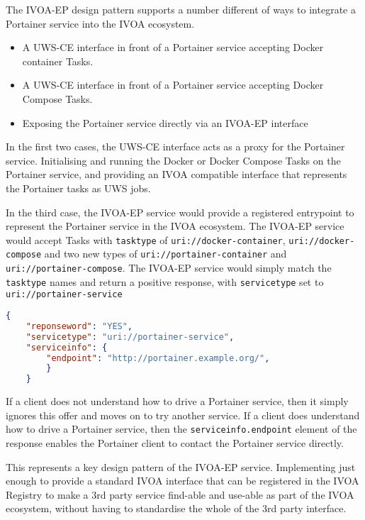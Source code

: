 \documentclass[11pt,a4paper]{ivoa}
\newcommand{\uws} {UWS\xspace}
\newcommand{\uwsce} {UWS-CE\xspace}
\newcommand{\ivoep} {IVOA-EP\xspace}
\newcommand{\docker} {Docker\xspace}
\newcommand{\dockercompose} {Docker Compose\xspace}
\newcommand{\portainer} {Portainer\xspace}
\newcommand{\codeword}[1] {\texttt{#1}}
\begin{document}
The \ivoep design pattern supports a number different of ways to integrate a \portainer service into the IVOA ecosystem.
\begin{itemize}
    \item A \uwsce interface in front of a \portainer service accepting \docker container Tasks.
    \item A \uwsce interface in front of a \portainer service accepting \dockercompose Tasks.
    \item Exposing the \portainer service directly via an \ivoep interface
\end{itemize}

In the first two cases, the \uwsce interface acts as a proxy for the \portainer service. Initialising and running the \docker or \dockercompose Tasks on the \portainer service, and providing an IVOA compatible interface that represents the \portainer tasks as \uws jobs.

In the third case, the \ivoep service would provide a registered entrypoint to represent the \portainer service in the IVOA ecosystem. 
The \ivoep service would accept Tasks with \codeword{tasktype} of \codeword{uri://docker-container}, \codeword{uri://docker-compose} and two new types of \codeword{uri://portainer-container} and  \codeword{uri://portainer-compose}.
The \ivoep service would simply match the \codeword{tasktype} names and return a positive response, with \codeword{servicetype} set to \codeword{uri://portainer-service}

\begin{lstlisting}[language=json]
    {
    "reponseword": "YES",
    "servicetype": "uri://portainer-service",
    "serviceinfo": {
        "endpoint": "http://portainer.example.org/",
        }
    }
\end{lstlisting}

If a client does not understand how to drive a \portainer service, then it simply ignores this offer and moves on to try another service.
If a client does understand how to drive a \portainer service, then the \codeword{serviceinfo.endpoint} element of the response enables the \portainer client to contact the \portainer service directly.

This represents a key design pattern of the \ivoep service. Implementing just enough to provide a standard IVOA interface that can be registered in the IVOA Registry to make a 3rd party service find-able and use-able as part of the IVOA ecosystem, without having to standardise the whole of the 3rd party interface.
\end{document}
